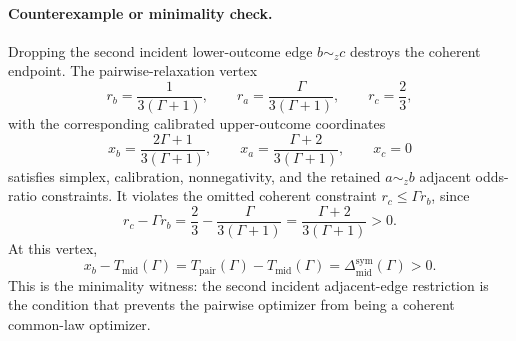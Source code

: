 \paragraph{Counterexample or minimality check.}
Dropping the second incident lower-outcome edge \(b\sim_z c\) destroys the coherent endpoint.  The pairwise-relaxation vertex
\[
  r_b=\frac{1}{3(\Gamma+1)},\qquad
  r_a=\frac{\Gamma}{3(\Gamma+1)},\qquad
  r_c=\frac23,
\]
with the corresponding calibrated upper-outcome coordinates
\[
  x_b=\frac{2\Gamma+1}{3(\Gamma+1)},\qquad
  x_a=\frac{\Gamma+2}{3(\Gamma+1)},\qquad
  x_c=0
\]
satisfies simplex, calibration, nonnegativity, and the retained \(a\sim_z b\) adjacent odds-ratio constraints.  It violates the omitted coherent constraint \(r_c\le\Gamma r_b\), since
\[
  r_c-\Gamma r_b
  =
  \frac23-\frac{\Gamma}{3(\Gamma+1)}
  =
  \frac{\Gamma+2}{3(\Gamma+1)}
  >0.
\]
At this vertex,
\[
  x_b-T_{\mathrm{mid}}(\Gamma)
  =
  T_{\mathrm{pair}}(\Gamma)-T_{\mathrm{mid}}(\Gamma)
  =
  \Delta_{\mathrm{mid}}^{\mathrm{sym}}(\Gamma)>0.
\]
This is the minimality witness: the second incident adjacent-edge restriction is the condition that prevents the pairwise optimizer from being a coherent common-law optimizer.
